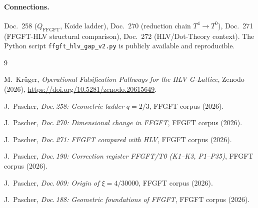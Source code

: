 \paragraph{Connections.}
Doc.~258 ($Q_\mathrm{FFGFT}$, Koide ladder), Doc.~270 (reduction chain
$T^4\to T^0$), Doc.~271 (FFGFT-HLV structural comparison), Doc.~272
(HLV/Dot-Theory context). The Python script
\texttt{ffgft\_hlv\_gap\_v2.py} is publicly available and reproducible.

\begin{thebibliography}{9}

M.~Krüger,
\emph{Operational Falsification Pathways for the HLV G-Lattice},
Zenodo (2026),
\url{https://doi.org/10.5281/zenodo.20615649}.

J.~Pascher, \emph{Doc.\,258: Geometric ladder $q=2/3$},
FFGFT corpus (2026).

J.~Pascher, \emph{Doc.\,270: Dimensional change in FFGFT},
FFGFT corpus (2026).

J.~Pascher, \emph{Doc.\,271: FFGFT compared with HLV},
FFGFT corpus (2026).

J.~Pascher, \emph{Doc.\,190: Correction register FFGFT/T0
(K1--K3, P1--P35)}, FFGFT corpus (2026).

J.~Pascher, \emph{Doc.\,009: Origin of $\xi = 4/30000$},
FFGFT corpus (2026).

J.~Pascher, \emph{Doc.\,188: Geometric foundations of FFGFT},
FFGFT corpus (2026).

\end{thebibliography}
